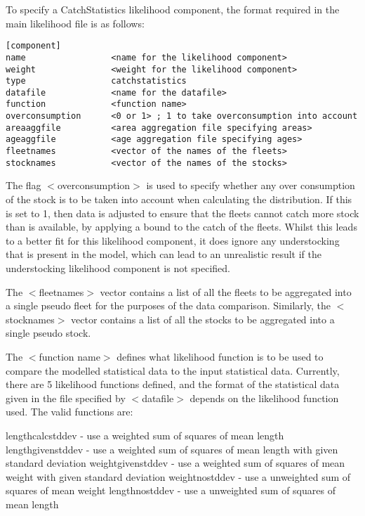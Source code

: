 \documentclass [a4paper, 10pt]{book}
\begin{document}
\bigskip
To specify a CatchStatistics likelihood component, the format required in the main likelihood file is as follows:

{\small\begin{verbatim}
[component]
name                 <name for the likelihood component>
weight               <weight for the likelihood component>
type                 catchstatistics
datafile             <name for the datafile>
function             <function name>
overconsumption      <0 or 1> ; 1 to take overconsumption into account
areaaggfile          <area aggregation file specifying areas>
ageaggfile           <age aggregation file specifying ages>
fleetnames           <vector of the names of the fleets>
stocknames           <vector of the names of the stocks>
\end{verbatim}}

The flag $<$overconsumption$>$ is used to specify whether any over consumption of the stock is to be taken into account when calculating the distribution.  If this is set to 1, then data is adjusted to ensure that the fleets cannot catch more stock than is available, by applying a bound to the catch of the fleets.  Whilst this leads to a better fit for this likelihood component, it does ignore any understocking that is present in the model, which can lead to an unrealistic result if the understocking likelihood component is not specified.

\bigskip
The $<$fleetnames$>$ vector contains a list of all the fleets to be aggregated into a single pseudo fleet for the purposes of the data comparison.  Similarly, the $<$stocknames$>$ vector contains a list of all the stocks to be aggregated into a single pseudo stock.

\bigskip
The $<$function name$>$ defines what likelihood function is to be used to compare the modelled statistical data to the input statistical data.  Currently, there are 5 likelihood functions defined, and the format of the statistical data given in the file specified by $<$datafile$>$ depends on the likelihood function used.  The valid functions are:

\bigskip
lengthcalcstddev - use a weighted sum of squares of mean length\newline
lengthgivenstddev - use a weighted sum of squares of mean length with given standard deviation\newline
weightgivenstddev - use a weighted sum of squares of mean weight with given standard deviation\newline
weightnostddev - use a unweighted sum of squares of mean weight\newline
lengthnostddev - use a unweighted sum of squares of mean length
\end{document}
